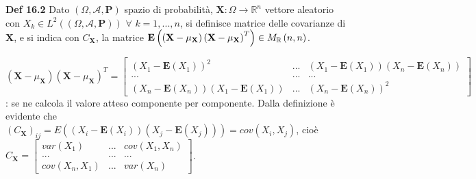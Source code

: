 \documentclass{article}
\begin{document}
\textbf{Def 16.2} Dato $\left( \Omega ,\mathcal{A},\mathbf{P}\right) $
spazio di probabilit\`{a}, $\mathbf{X}:\Omega \rightarrow 
\mathbb{R}
^{n}$ vettore aleatorio con $X_{k}\in L^{2}\left( \left( \Omega ,\mathcal{A},%
\mathbf{P}\right) \right) $ $\forall $ $k=1,...,n$, si definisce matrice
delle covarianze di $\mathbf{X}$, e si indica con $C_{\mathbf{X}}$, la
matrice $\mathbf{E}\left( \left( \mathbf{X}-\mu _{\mathbf{X}}\right) \left( 
\mathbf{X}-\mu _{\mathbf{X}}\right) ^{T}\right) \in M_{%
\mathbb{R}
}\left( n,n\right) $.

$\left( \mathbf{X}-\mu _{\mathbf{X}}\right) \left( \mathbf{X}-\mu _{\mathbf{X%
}}\right) ^{T}=\left[ 
\begin{array}{ccc}
\left( X_{1}-\mathbf{E}\left( X_{1}\right) \right) ^{2} & ... & \left( X_{1}-%
\mathbf{E}\left( X_{1}\right) \right) \left( X_{n}-\mathbf{E}\left(
X_{n}\right) \right) \\ 
... & ... & ... \\ 
\left( X_{n}-\mathbf{E}\left( X_{n}\right) \right) \left( X_{1}-\mathbf{E}%
\left( X_{1}\right) \right) & ... & \left( X_{n}-\mathbf{E}\left(
X_{n}\right) \right) ^{2}%
\end{array}%
\right] $: se ne calcola il valore atteso componente per componente. Dalla
definizione \`{e} evidente che $\left( C_{\mathbf{X}}\right) _{ij}=E\left(
\left( X_{i}-\mathbf{E}\left( X_{i}\right) \right) \left( X_{j}-\mathbf{E}%
\left( X_{j}\right) \right) \right) =cov\left( X_{i},X_{j}\right) $, cio\`{e}
$C_{\mathbf{X}}=\left[ 
\begin{array}{ccc}
var\left( X_{1}\right) & ... & cov\left( X_{1},X_{n}\right) \\ 
... & ... & ... \\ 
cov\left( X_{n},X_{1}\right) & ... & var\left( X_{n}\right)%
\end{array}%
\right] $.
\end{document}
